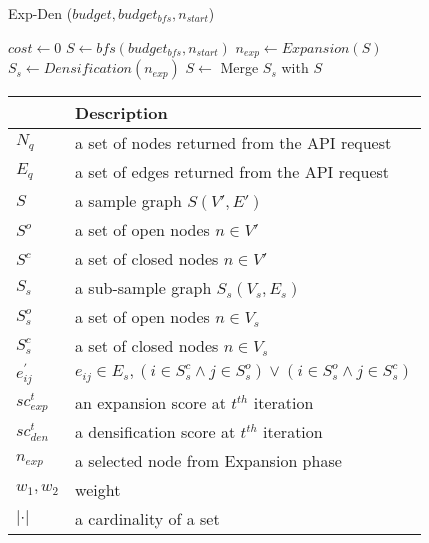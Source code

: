 



\begin{algorithm}
\small
\caption{Exp-Den ({$budget, budget_{bfs}, n_{start}$})}\label{exp-den}
\begin{algorithmic}[1]
\State $cost \gets 0$
\State $S \gets bfs(budget_{bfs}, n_{start})$ 
	\State $n_{exp} \gets Expansion(S)$
	\State $S_{s} \gets Densification(n_{exp})$
	\State $S \gets $ Merge $S_{s}$ with $S$
\EndWhile
\end{algorithmic}
\end{algorithm}

\begin{center}
	 \label{tab:notation} 
    \begin{tabular}{  l | l }
    \hline
	 &  Description \\ \hline
	$N_{q}$ & a set of nodes returned from the API request\\
	$E_{q}$ & a set of edges returned from the API request\\
	$S$ & a sample graph $S(V',E')$ \\
	$S^{o}$ & a set of open nodes $n \in V'$\\
	$S^{c}$ & a set of closed nodes $n \in V'$\\
	$S_{s}$ & a sub-sample graph $S_{s}(V_{s},E_{s})$\\
	$S_{s}^{o}$ & a set of open nodes $n \in V_{s}$\\
	$S_{s}^{c}$ & a set of closed nodes $n \in V_{s}$\\
	$e_{ij}^{'}$ & $e_{ij} \in E_{s},(i \in S_{s}^{c} \wedge j \in S_{s}^{o})\vee(i \in S_{s}^{o} \wedge j \in S_{s}^{c}) $ \\
	$sc_{exp}^{t}$ & an expansion score at $t^{th}$ iteration \\
	$sc_{den}^{t}$ & a densification score at $t^{th}$ iteration \\
	$n_{exp}$ & a selected node from Expansion phase \\
	$w_{1}, w_{2}$ & weight \\	
	$|\cdot|$ & a cardinality of a set \\ \hline
    \end{tabular}
    
\end{center}


